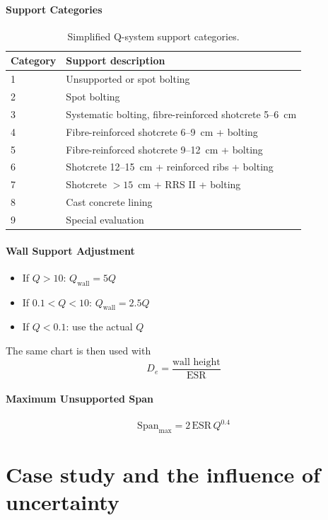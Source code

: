 \paragraph{Support Categories}

\begin{table}[ht]
\centering
\begin{tabular}{ll}
\toprule
\textbf{Category} & \textbf{Support description} \\
\midrule
1 & Unsupported or spot bolting \\
2 & Spot bolting \\
3 & Systematic bolting, fibre-reinforced shotcrete 5--6~cm \\
4 & Fibre-reinforced shotcrete 6--9~cm + bolting \\
5 & Fibre-reinforced shotcrete 9--12~cm + bolting \\
6 & Shotcrete 12--15~cm + reinforced ribs + bolting \\
7 & Shotcrete $>15$~cm + RRS II + bolting \\
8 & Cast concrete lining \\
9 & Special evaluation \\
\bottomrule
\end{tabular}
\caption{Simplified Q-system support categories.}
\end{table}

\paragraph{Wall Support Adjustment}
\begin{itemize}
 \item If $Q > 10$: $Q_{\text{wall}} = 5Q$
 \item If $0.1 < Q < 10$: $Q_{\text{wall}} = 2.5Q$
 \item If $Q < 0.1$: use the actual $Q$
\end{itemize}
The same chart is then used with
\[
D_e = \frac{\text{wall height}}{\text{ESR}}
\]

\paragraph{Maximum Unsupported Span}
\[
\mathrm{Span}_{\max} = 2 \, \mathrm{ESR} \, Q^{0.4}
\]

\section{Case study and the influence of uncertainty}
\label{sec:case-study-and-the-influence-of-uncertainty}

